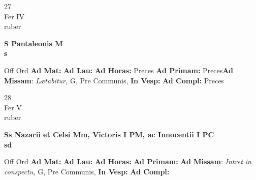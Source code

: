 \documentclass[10pt, openany]{book}
\begin{document}
        \begin{center}
            \begin{minipage}{3.5in}
                \vspace{2em}
                \begin{minipage}{0.5in}
                    {\Huge 27} \\
                    {\normalsize Fer IV} \\
                    {\normalsize ruber}
                \end{minipage}
                \begin{minipage}{3.0in}
                    \textbf{ \large S Pantaleonis M \\
                    \textnormal{\normalsize s}} \\ 
                \end{minipage}
                \begin{justify}Off Ord
                    \textbf{Ad Mat: }
                    \textbf{Ad Lau: }
                    \textbf{Ad Horas: }Preces
                    \textbf{Ad Primam: }Preces\textbf{Ad Missam}: \textit{Lætabitur,} G, Pre Communis,  
                    \textbf{In Vesp: }
                    \textbf{Ad Compl: }Preces
                \end{justify}
            \end{minipage}
        \end{center}
    
        \begin{center}
            \begin{minipage}{3.5in}
                \vspace{2em}
                \begin{minipage}{0.5in}
                    {\Huge 28} \\
                    {\normalsize Fer V} \\
                    {\normalsize ruber}
                \end{minipage}
                \begin{minipage}{3.0in}
                    \textbf{ \large Ss Nazarii et Celsi Mm, Victoris I PM, ac Innocentii I PC \\
                    \textnormal{\normalsize sd}} \\ 
                \end{minipage}
                \begin{justify}Off Ord
                    \textbf{Ad Mat: }
                    \textbf{Ad Lau: }
                    \textbf{Ad Horas: }
                    \textbf{Ad Primam: }\textbf{Ad Missam}: \textit{Intret in conspectu,} G, Pre Communis,  
                    \textbf{In Vesp: }
                    \textbf{Ad Compl: }
                \end{justify}
            \end{minipage}
        \end{center}
    
\end{document}

